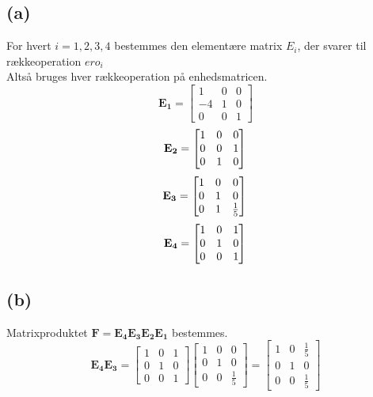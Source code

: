 \documentclass[12pt]{article}
\begin{document}
\subsection{(a)}
For hvert $i=1,2,3,4$ bestemmes den elementære matrix $E_i$, der svarer til rækkeoperation $ero_i$\\
Altså bruges hver rækkeoperation på enhedsmatricen.
$$
\mathbf{E_1}=
\begin{bmatrix}
1&0&0\\
-4&1&0\\
0&0&1
\end{bmatrix}
$$
$$
\mathbf{E_2}=
\begin{bmatrix}
1&0&0\\
0&0&1\\
0&1&0
\end{bmatrix}\\
$$
$$
\mathbf{E_3}=
\begin{bmatrix}
1&0&0\\
0&1&0\\
0&1&\tfrac{1}{5}
\end{bmatrix}\\
$$
$$
\mathbf{E_4}=
\begin{bmatrix}
1&0&1\\
0&1&0\\
0&0&1
\end{bmatrix}\\
$$

\subsection{(b)}
Matrixproduktet $\mathbf{F=E_4E_3E_2E_1}$ bestemmes.\\
$$\mathbf{E_4E_3}=
\begin{bmatrix}
1&0&1\\
0&1&0\\
0&0&1
\end{bmatrix}
\begin{bmatrix}
1&0&0\\
0&1&0\\
0&0&\frac{1}{5}
\end{bmatrix}
=
\begin{bmatrix}
1&0&\frac{1}{5}\\
0&1&0\\
0&0&\frac{1}{5}
\end{bmatrix}
$$
\end{document}
